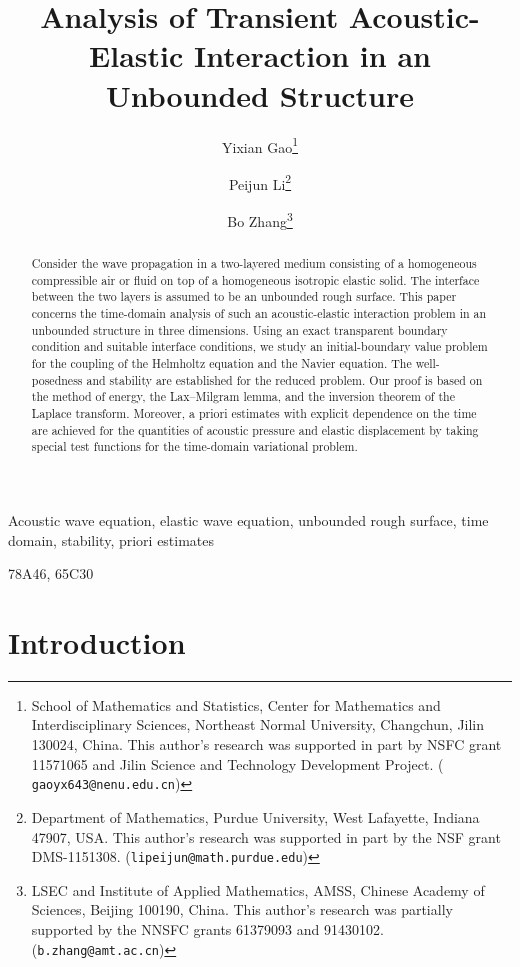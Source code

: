 \documentclass[final,leqno]{siamltex}
\title{Analysis of Transient Acoustic-Elastic Interaction in an Unbounded
Structure}
\author{Yixian Gao\thanks{School of Mathematics and Statistics, Center for
Mathematics and Interdisciplinary Sciences, Northeast Normal University,
Changchun, Jilin 130024, China. This author's research was supported in part by
NSFC grant 11571065 and Jilin Science and Technology Development Project. ({\tt
gaoyx643@nenu.edu.cn})} \and Peijun Li\thanks{Department of Mathematics, Purdue
University, West Lafayette, Indiana 47907, USA. This author's research was
supported in part by the NSF grant DMS-1151308.
({\tt lipeijun@math.purdue.edu})} \and Bo Zhang\thanks{LSEC and Institute of
Applied Mathematics, AMSS, Chinese Academy of Sciences, Beijing 100190, China.
This author's research was partially supported by the
NNSFC grants 61379093 and 91430102. ({\tt b.zhang@amt.ac.cn})}}
\begin{document}
\maketitle

\begin{abstract}
Consider the wave propagation in a two-layered medium consisting of a homogeneous
compressible air or fluid on top of a homogeneous isotropic elastic solid. The
interface between the two layers is assumed to be an unbounded rough surface.
This paper concerns the time-domain analysis of such an acoustic-elastic
interaction problem in an unbounded structure in three dimensions.
Using an exact transparent boundary condition and suitable interface conditions,
we study an initial-boundary value problem for the coupling of the Helmholtz
equation and the Navier equation. The well-posedness and stability are
established for the reduced problem. Our proof is based on the method of energy,
the Lax--Milgram lemma, and the inversion theorem of the Laplace transform.
Moreover, a priori estimates with explicit dependence on the time are achieved
for the quantities of acoustic pressure and elastic displacement by taking
special test functions for the time-domain variational problem.
\end{abstract}

\begin{keywords}
Acoustic wave equation, elastic wave equation, unbounded rough surface,
time domain, stability, priori estimates
\end{keywords}

\begin{AMS}
78A46, 65C30
\end{AMS}

\pagestyle{myheadings}
\thispagestyle{plain}

\section{Introduction}
\end{document}
